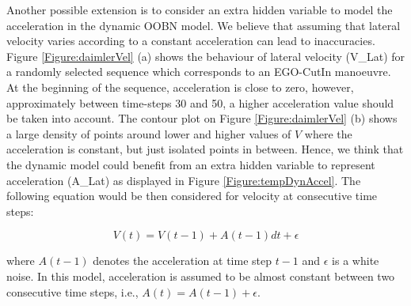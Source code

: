 Another possible extension is to consider an extra hidden variable to model the acceleration in the dynamic OOBN model. We believe that assuming that lateral velocity varies according to a constant acceleration can lead to inaccuracies. Figure \ref{Figure:daimlerVel} (a) shows the behaviour of lateral velocity (V\_Lat) for a randomly selected sequence which corresponds to an EGO-CutIn manoeuvre. At the beginning of the sequence, acceleration is close to zero, however, approximately between time-steps 30 and 50, a higher acceleration value should be taken into account. The contour plot on Figure \ref{Figure:daimlerVel} (b) shows a large density of points around lower and higher values of $V$ where the acceleration is constant, but just isolated points in between. Hence, we think that the dynamic model could benefit from an extra hidden variable to represent acceleration (A\_Lat) as displayed in Figure \ref{Figure:tempDynAccel}. The following equation would be then considered for velocity at consecutive time steps: %

\begin{equation}
V(t) =V(t-1) +A(t-1)dt +\epsilon
\end{equation}

\noindent where $A(t-1)$ denotes the acceleration at time step $t-1$ and $\epsilon$ is a white noise. In this model, acceleration is assumed to be almost constant between two consecutive time steps, i.e., $A(t) = A(t-1) + \epsilon$. 

